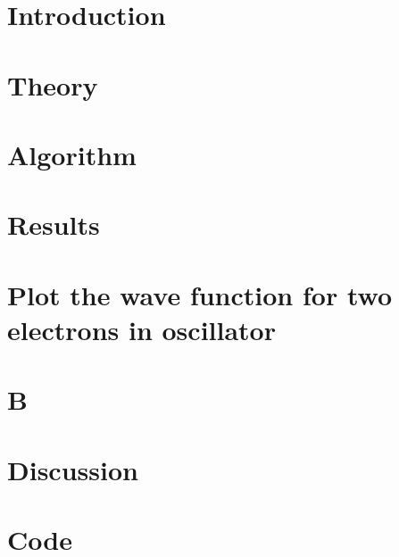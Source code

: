 \documentclass[a4paper,english]{article}
\author{Kristoffer Brækken, Vedad Hodzic, Paul Magnus
Sørensen-Clark}
\begin{document}
\begin{titlepage}
    \thispagestyle{empty}
    
\end{titlepage}

\section{Introduction}


\section{Theory}


\section{Algorithm}


\section{Results}





\section{Plot the wave function for two electrons in oscillator}


\section{B}


\section{Discussion}


\section{Code}

\end{document}
